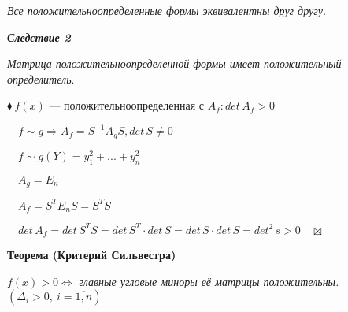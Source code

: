 \documentclass[a4paper, 12pt]{report}
\begin{document}
	\textit{ Все положительноопределенные формы эквивалентны друг другу.}
	\par \bigskip
	\textit{\textbf{Следствие 2}}\par
	\textit{Матрица положительноопределенной формы имеет положительный определитель}.
	\par \bigskip
	$\blacklozenge\ f(x)$ --- положительноопределенная с $A_f : det\, A_f >0$\par
	$\quad f \sim g\Rightarrow A_f=S^{-1} A_g S, det \, S \ne 0$\par
	$\quad f \sim g(Y)=y_1^2+...+y_n^2$\par
	$\quad A_g=E_n$\par
	$\quad A_f=S^{T} E_n S = S^{T} S$\par
	$\quad det \, A_f = det \, S^{T} S = det\, S^{T} \cdot det \, S= det\, S \cdot det \, S = det^2\, s>0 \quad \boxtimes$\par
	\par \bigskip
	\textbf{Теорема (Критерий Сильвестра)}\par
	$f(x)>0\Longleftrightarrow$\textit{ главные угловые миноры её матрицы положительны. }$
	(\Delta_i > 0,\ i=\overline{1,n})$
	
\end{document}
